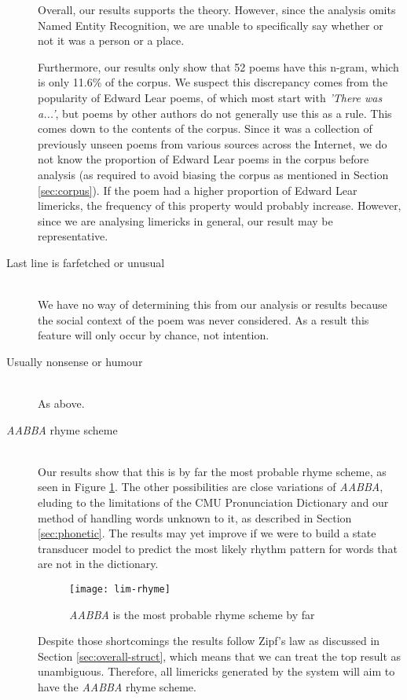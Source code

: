 \begin{description}
Overall, our results supports the theory. However, since the analysis omits Named Entity Recognition, we are unable to specifically say whether or not it was a person or a place.

Furthermore, our results only show that 52 poems have this n-gram, which is only 11.6\% of the corpus. We suspect this discrepancy comes from the popularity of Edward Lear poems, of which most start with \textit{'There was a...'}, but poems by other authors do not generally use this as a rule. This comes down to the contents of the corpus. Since it was a collection of previously unseen poems from various sources across the Internet, we do not know the proportion of Edward Lear poems in the corpus before analysis (as required to avoid biasing the corpus as mentioned in Section \ref{sec:corpus}). If the poem had a higher proportion of Edward Lear limericks, the frequency of this property would probably increase. However, since we are analysing limericks in general, our result may be representative.

\item[Last line is farfetched or unusual]  \hfill \\
We have no way of determining this from our analysis or results because the social context of the poem was never considered. As a result this feature will only occur by chance, not intention.

\item[Usually nonsense or humour]  \hfill \\
As above.

\item[\textit{AABBA} rhyme scheme]  \hfill \\
Our results show that this is by far the most probable rhyme scheme, as seen in Figure \ref{fig:lim-rhyme}. The other possibilities are close variations of \textit{AABBA}, eluding to the limitations of the CMU Pronunciation Dictionary and our method of handling words unknown to it, as described in Section \ref{sec:phonetic}. The results may yet improve if we were to build a state transducer model to predict the most likely rhythm pattern for words that are not in the dictionary.

\begin{figure}[H]
\centering
\texttt{[image: lim-rhyme]}
\caption{\textit{AABBA} is the most probable rhyme scheme by far}
\label{fig:lim-rhyme}
\end{figure}

Despite those shortcomings the results follow Zipf's law as discussed in Section \ref{sec:overall-struct}, which means that we can treat the top result as unambiguous. Therefore, all limericks generated by the system will aim to have the \textit{AABBA} rhyme scheme.


\end{description}
